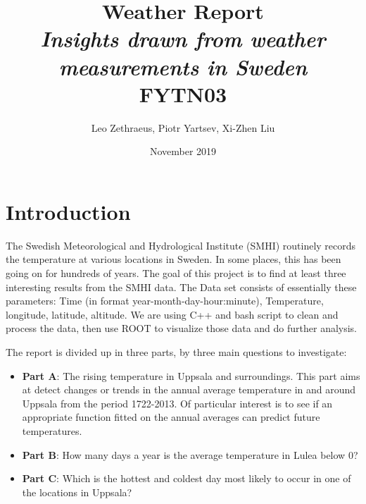 \documentclass[a4paper]{article}
\begin{document}
\title{Weather Report\\\textit{Insights drawn from weather measurements in Sweden} \\ FYTN03}
\author{Leo Zethraeus, 
Piotr Yartsev, Xi-Zhen Liu} %
\date{November 2019} %
\maketitle
\newpage
\tableofcontents

\newpage

\section{Introduction}\label{sec:intro}
The Swedish Meteorological and Hydrological Institute (SMHI) routinely records the temperature at various locations in Sweden. In some places, this has been going on for hundreds of years. The goal of this project is to find at least three interesting results from the SMHI data. The Data set consists of essentially these parameters: Time (in format year-month-day-hour:minute), Temperature, longitude, latitude, altitude. We are using C++ and bash script to clean and process the data, then use ROOT to visualize those data and do further analysis. 


The report is divided up in three parts, by three main questions to investigate:
\begin{itemize}
\item \textbf{Part A}: The rising temperature in Uppsala and surroundings. This part aims at detect changes or trends in the annual average temperature in and around Uppsala from the period 1722-2013. Of particular interest is to see if an appropriate function fitted on the annual averages can predict future temperatures.\\

\item \textbf{Part B}: How many days a year is the average temperature in Lulea below 0?

\item \textbf{Part C}: Which is the hottest and coldest day most likely to occur in one of the locations in Uppsala?
\end{itemize}
\end{document}
